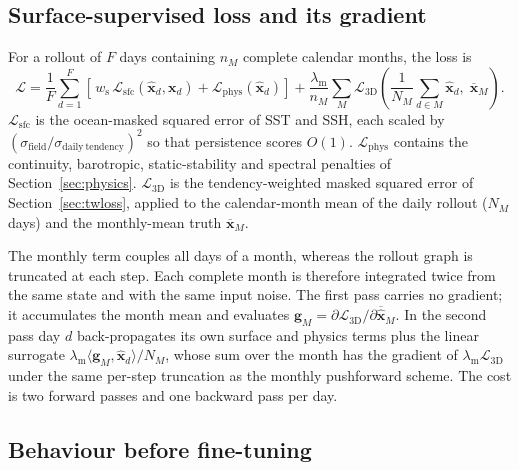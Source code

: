 \documentclass[11pt]{article}
\begin{document}
\subsection{Surface-supervised loss and its gradient}

For a rollout of $F$ days containing $n_M$ complete calendar months, the loss is
\begin{equation}
  \mathcal{L} = \frac{1}{F}\sum_{d=1}^{F}
     \left[\, w_{\mathrm{s}}\,\mathcal{L}_{\mathrm{sfc}}(\hat{\mathbf{x}}_d, \mathbf{x}_d)
            + \mathcal{L}_{\mathrm{phys}}(\hat{\mathbf{x}}_d) \right]
   + \frac{\lambda_{\mathrm{m}}}{n_M}\sum_{M}
     \mathcal{L}_{\mathrm{3D}}\!\left(\frac{1}{N_M}\sum_{d\in M}\hat{\mathbf{x}}_d,\;
            \overline{\mathbf{x}}_M\right).
  \label{eq:daily-loss}
\end{equation}
$\mathcal{L}_{\mathrm{sfc}}$ is the ocean-masked squared error of SST and SSH,
each scaled by $(\sigma_{\mathrm{field}}/\sigma_{\mathrm{daily\ tendency}})^2$
so that persistence scores $O(1)$. $\mathcal{L}_{\mathrm{phys}}$ contains the
continuity, barotropic, static-stability and spectral penalties of
Section~\ref{sec:physics}. $\mathcal{L}_{\mathrm{3D}}$ is the tendency-weighted
masked squared error of Section~\ref{sec:twloss}, applied to the calendar-month
mean of the daily rollout ($N_M$ days) and the monthly-mean truth
$\overline{\mathbf{x}}_M$.

The monthly term couples all days of a month, whereas the rollout graph is
truncated at each step. Each complete month is therefore integrated twice from
the same state and with the same input noise. The first pass carries no
gradient; it accumulates the month mean and evaluates
$\mathbf{g}_M = \partial\mathcal{L}_{\mathrm{3D}}/\partial\overline{\hat{\mathbf{x}}}_M$.
In the second pass day $d$ back-propagates its own surface and physics terms
plus the linear surrogate
$\lambda_{\mathrm{m}} \langle \mathbf{g}_M, \hat{\mathbf{x}}_d\rangle / N_M$,
whose sum over the month has the gradient of
$\lambda_{\mathrm{m}}\mathcal{L}_{\mathrm{3D}}$ under the same per-step
truncation as the monthly pushforward scheme. The cost is two forward passes and
one backward pass per day.

\subsection{Behaviour before fine-tuning}
\end{document}
